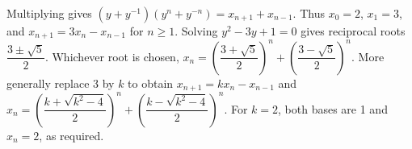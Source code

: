 Multiplying gives $(y+y^{-1})(y^n+y^{-n})=x_{n+1}+x_{n-1}$. Thus $x_0=2$, $x_1=3$, and $x_{n+1}=3x_n-x_{n-1}$ for $n\ge1$. Solving $y^2-3y+1=0$ gives reciprocal roots $\dfrac{3\pm\sqrt5}{2}$. Whichever root is chosen, $\boxed{x_n=\left(\dfrac{3+\sqrt5}{2}\right)^n+\left(\dfrac{3-\sqrt5}{2}\right)^n}$. More generally replace 3 by $k$ to obtain $x_{n+1}=kx_n-x_{n-1}$ and $\boxed{x_n=\left(\dfrac{k+\sqrt{k^2-4}}{2}\right)^n+\left(\dfrac{k-\sqrt{k^2-4}}{2}\right)^n}$. For $k=2$, both bases are 1 and $x_n=2$, as required.
